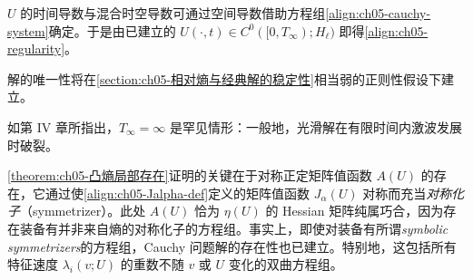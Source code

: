 \documentclass[../../main.tex]{subfiles}
\begin{document}
$U$ 的时间导数与混合时空导数可通过空间导数借助方程组\eqref{align:ch05-cauchy-system}确定。于是由已建立的 $U(\cdot,t)\in C^{0}([0,T_{\infty});H_{\ell})$ 即得\eqref{align:ch05-regularity}。

解的唯一性将在\cref{section:ch05-相对熵与经典解的稳定性}相当弱的正则性假设下建立。

如第 IV 章所指出，$T_{\infty}=\infty$ 是罕见情形：一般地，光滑解在有限时间内激波发展时破裂。

\cref{theorem:ch05-凸熵局部存在}证明的关键在于对称正定矩阵值函数 $A(U)$ 的存在，它通过使\eqref{align:ch05-Jalpha-def}定义的矩阵值函数 $J_{\alpha}(U)$ 对称而充当\emph{对称化子}（symmetrizer）。此处 $A(U)$ 恰为 $\eta(U)$ 的 Hessian 矩阵纯属巧合，因为存在装备有并非来自熵的对称化子的方程组。事实上，即使对装备有所谓\emph{symbolic symmetrizers}的方程组，Cauchy 问题解的存在性也已建立。特别地，这包括所有特征速度 $\lambda_{i}(v;U)$ 的重数不随 $v$ 或 $U$ 变化的双曲方程组。
\end{document}
